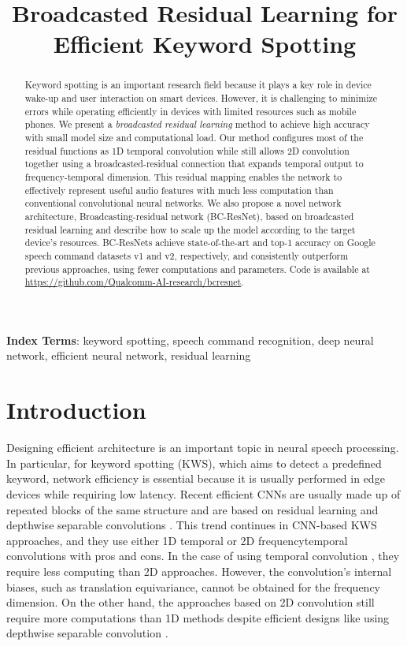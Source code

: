 \documentclass[a4paper]{article}
\title{Broadcasted Residual Learning for Efficient Keyword Spotting}
\begin{document}
\maketitle


\begin{abstract}
Keyword spotting is an important research field because it plays a key role in device wake-up and user interaction on smart devices. However, it is challenging to minimize errors while operating efficiently in devices with limited resources such as mobile phones. We present a \textit{broadcasted residual learning} method to achieve high accuracy with small model size and computational load. Our method configures most of the residual functions as 1D temporal convolution while still allows 2D convolution together using a broadcasted-residual connection that expands temporal output to frequency-temporal dimension. This residual mapping enables the network to effectively represent useful audio features with much less computation than conventional convolutional neural networks. We also propose a novel network architecture, Broadcasting-residual network (BC-ResNet), based on broadcasted residual learning and describe how to scale up the model according to the target device's resources. BC-ResNets achieve state-of-the-art  and   top-1 accuracy on Google speech command datasets v1 and v2, respectively, and consistently outperform previous approaches, using fewer computations and parameters. Code is available at \href{https://github.com/Qualcomm-AI-research/bcresnet}{https://github.com/Qualcomm-AI-research/bcresnet}.
\end{abstract}
\noindent\textbf{Index Terms}: keyword spotting, speech command recognition, deep neural network, efficient neural network, residual learning

\section{Introduction}
Designing efficient architecture is an important topic in neural speech processing.
In particular, for keyword spotting (KWS), which aims to detect a predefined keyword, network efficiency is essential because it is usually performed in edge devices while requiring low latency. Recent efficient CNNs \cite{mobilenet1, mobilenet2, shufflenet, efficientnet} are usually made up of repeated blocks of the same structure and are based on residual learning \cite{residual} and depthwise separable convolutions \cite{depthwise_conv}. This trend continues in CNN-based KWS approaches, and they use either 1D temporal or 2D frequencytemporal convolutions with pros and cons. In the case of using temporal convolution \cite{tcresnet, tenet, matchbox}, they require less computing than 2D approaches. However, the convolution's internal biases, such as translation equivariance, cannot be obtained for the frequency dimension. On the other hand, the approaches based on 2D convolution still require more computations than 1D methods despite efficient designs like using depthwise separable convolution \cite{res15, ds-resnet}.
\end{document}
